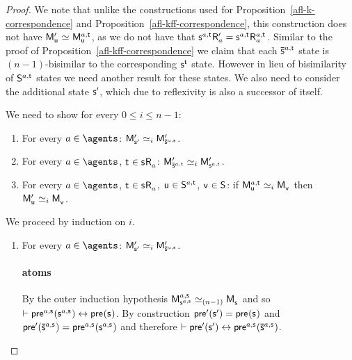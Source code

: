 \begin{proof}
We note that unlike the constructions used for Proposition~\ref{afl-k-correspondence} and Proposition~\ref{afl-kff-correspondence}, this construction does not have $\aPModel[\prime]{\aStateU} \bisimilar \aPModel[\agentA,\aStateT]{\aStateU}$, as we do not have that 
$\aStateS[\agentA,\aStateT] \aAccessibility[\prime]{\agentA} = \aStateS[\agentA,\aStateT] \aAccessibility[\agentA,\aStateT]{\agentA}$.
Similar to the proof of Proposition~\ref{afl-kff-correspondence} we claim that each $\aPStateS[\agentA,\aStateT]$ state is $(n-1)$-bisimilar to the corresponding $\aStateS[\aStateT]$ state. 
However in lieu of bisimilarity of $\aStates[\agentA,\aStateT]$ states we need another result for these states.
We also need to consider the additional state $\aStateS[\prime]$, which due to reflexivity is also a successor of itself.

We need to show for every $0 \leq i \leq n - 1$: 
\begin{enumerate}
    \item For every $\agentA \in \agents$: $\aPModel[\prime]{\aStateS[\prime]} \bisimilar[i] \aPModel[\prime]{\aPStateS[\agentA,\aStateS]}$.
    \item For every $\agentA \in \agents$, $\aStateT \in \aStateS \aAccessibility{\agentA}$: $\aPModel[\prime]{\aPStateS[\agentA,\aStateT]} \bisimilar[i] \aPModel[\prime]{\aStateS[\agentA,\aStateT]}$.
    \item For every $\agentA \in \agents$, $\aStateT \in \aStateS \aAccessibility{\agentA}$, $\aStateU \in \aStates[\agentA,\aStateT]$, $\aStateV \in \aStates$: if $\aPModel[\agentA,\aStateT]{\aStateU} \bisimilar[i] \aPModel{\aStateV}$ then $\aPModel[\prime]{\aStateU} \bisimilar[i] \aPModel{\aStateV}$.
\end{enumerate}

We proceed by induction on $i$.

\begin{enumerate}
    \item 
        For every $\agentA \in \agents$: $\aPModel[\prime]{\aStateS[\prime]} \bisimilar[i] \aPModel[\prime]{\aPStateS[\agentA,\aStateS]}$.

        \paragraph{atoms}

        By the outer induction hypothesis $\aPModel[\agentA,\aStateS]{\aStateS[\agentA,\aStateS]} \bisimilar[(n - 1)] \aPModel{\aStateS}$ and so $\proves \aPrecondition[\agentA,\aStateS](\aStateS[\agentA,\aStateS]) \iff \aPrecondition(\aStateS)$.
        By construction $\aPrecondition[\prime](\aStateS[\prime]) = \aPrecondition(\aStateS)$ and $\aPrecondition[\prime](\aPStateS[\agentA,\aStateS]) = \aPrecondition[\agentA,\aStateS](\aStateS[\agentA,\aStateS])$ and therefore $\proves \aPrecondition[\prime](\aStateS[\prime]) \iff \aPrecondition[\agentA,\aStateS](\aPStateS[\agentA,\aStateS])$.


\end{enumerate}
\end{proof}
